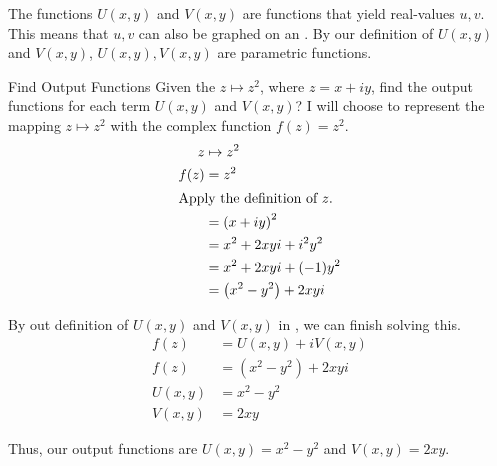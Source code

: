 The functions $U(x, y)$ and $V(x, y)$ are functions that yield real-values $u, v$.
This means that $u, v$ can also be graphed on an .
By our definition of $U(x, y)$ and $V(x, y)$, $U(x, y), V(x, y)$ are parametric functions.

\begin{example}[Lecture 4]{Find Output Functions}
  Given the  $z \mapsto z^{2}$, where $z = x + iy$, find the output functions for each term $U(x, y)$ and $V(x, y)$?
  \tcblower{}
  I will choose to represent the mapping $z \mapsto z^{2}$ with the complex function $f(z) = z^{2}$.
  \begin{align*}
    z &\mapsto z^{2} \\
    f(z) &= z^{2} \\
    \shortintertext{Apply the definition of $z$.}
      &= {(x + iy)}^{2} \\
      &= x^{2} + 2xyi + i^{2}y^{2} \\
      &= x^{2} + 2xyi + (-1)y^{2} \\
      &= \left( x^{2} - y^{2} \right) + 2xyi \\
  \end{align*}

  By out definition of $U(x, y)$ and $V(x, y)$ in , we can finish solving this.
  \begin{align*}
    f(z) &= U(x, y) + iV(x, y) \\
    f(z) &= \left( x^{2} - y^{2} \right) + 2xyi \\
    U(x, y) &= x^{2} - y^{2} \\
    V(x, y) &= 2xy
  \end{align*}

  Thus, our output functions are $U(x, y) = x^{2} - y^{2}$ and $V(x, y) = 2xy$.
\end{example}








